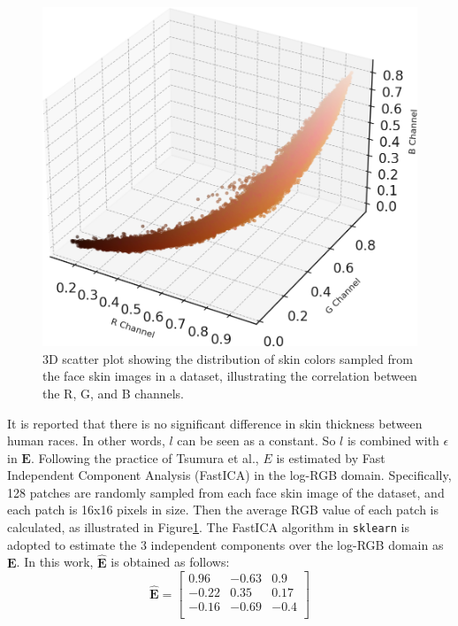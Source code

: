 \begin{spacing}{1.5}
\begin{figure}[t!]
    \centering
    \includegraphics{Chapter3/original_data_rounded_plot.png}
    \caption{3D scatter plot showing the distribution of skin colors sampled from the face skin images in a dataset, illustrating the correlation between the R, G, and B channels.}
    \label{fig:3dplot}
\end{figure}

It is reported that there is no significant difference in skin thickness between human races\cite{Whitmore2000}. In other words, $l$ can be seen as a constant. So $l$ is combined with $\epsilon$ in $\mathbf{E}$. Following the practice of Tsumura et al.\cite{tsumura1999independent}, $E$ is estimated by Fast Independent Component Analysis (FastICA)\cite{HYVARINEN2000411} in the log-RGB domain. Specifically, 128 patches are randomly sampled from each face skin image of the dataset, and each patch is 16x16 pixels in size. Then the average RGB value of each patch is calculated, as illustrated in Figure\ref{fig:3dplot}. The FastICA algorithm in \texttt{sklearn}\cite{scikit-learn} is adopted to estimate the 3 independent components over the log-RGB domain as $\mathbf{E}$. In this work, $\hat{\mathbf{E}}$ is obtained as follows:
\begin{equation}
    \hat{\mathbf{E}} = \begin{bmatrix}
        0.96  & -0.63 & 0.9  \\
        -0.22 & 0.35  & 0.17 \\
        -0.16 & -0.69 & -0.4 \\
    \end{bmatrix}
\end{equation}


\end{spacing}
